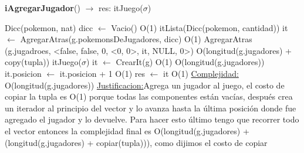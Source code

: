 \begin{Algoritmos}
\begin{algorithm}[H]{\textbf{iAgregarJugador}() $\to$ res: itJuego($\sigma$)}
	\begin{algorithmic}[1]
		\State Dicc(pokemon, nat) dicc $\gets$ Vacio() \Comment O(1)
		\State itLista(Dicc(pokemon, cantidad)) it $\gets$ AgregarAtras(g.pokemonsDeJugadores, dicc) \Comment O(1) 
		\State AgregarAtras (g.jugadroes, <false, false, 0, <0, 0>, it, NULL, 0>) \Comment O(longitud(g.jugadores) + copy(tupla))
		\State   itJuego($\sigma$) it $\gets$ CrearIt(g) \Comment O(1)
		 \Comment O(longitud(g.jugadores))
			\State it.posicion $\gets$ it.posicion + 1 \Comment O(1)
		\EndWhile
		\State res $\gets$ it \Comment O(1)
		\medskip
		\Statex \underline{Complejidad:} O(longitud(g.jugadores))
		\Statex \underline{Justificacion:}Agrega un jugador al juego, el costo de copiar la tupla es O(1) porque todas las componentes están vacías, después crea un iterador al principio del vector y lo avanza hasta la última posición donde fue agregado el jugador y lo devuelve. Para hacer esto último tengo que recorrer todo el vector entonces la complejidad final es O(longitud(g.jugadores) + (longitud(g.jugadores) + copiar(tupla))), como dijimos el costo de copiar  
	\end{algorithmic}
\end{algorithm}



\end{Algoritmos}
